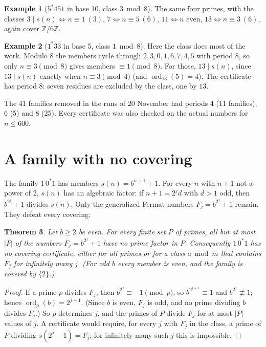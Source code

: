 \documentclass[11pt]{article}
\newtheorem{theorem}{Theorem}
\theoremstyle{definition}
\newtheorem{example}[theorem]{Example}
\theoremstyle{remark}
\newcommand{\ord}{\operatorname{ord}}
\begin{document}
\begin{example}[$5^*451$ in base 10, class $3 \bmod 8$]
The same four primes, with the classes $3\mid s(n)\iff n\equiv1\ (3)$, $7\iff n\equiv 5\ (6)$, $11\iff n$ even, $13\iff n\equiv 3\ (6)$, again cover $\mathbb{Z}/6\mathbb{Z}$.
\end{example}

\begin{example}[$1^*33$ in base 5, class $1 \bmod 8$]
Here the class does most of the work. Modulo $8$ the members cycle through $2,3,0,1,6,7,4,5$ with period $8$, so only $n\equiv 3\pmod 8$ gives members $\equiv 1\pmod 8$. For those, $13\mid s(n)$, since $13\mid s(n)$ exactly when $n\equiv 3\pmod 4$ (and $\ord_{13}(5)=4$). The certificate has period $8$: seven residues are excluded by the class, one by $13$.
\end{example}

The 41 families removed in the runs of 20 November had periods 4 (11 families), 6 (5) and 8 (25). Every certificate was also checked on the actual numbers for $n\le 600$.

\section{A family with no covering}

The family $1\,0^*1$ has members $s(n)=b^{n+1}+1$. For every $n$ with $n+1$ not a power of $2$, $s(n)$ has an algebraic factor: if $n+1=2^jd$ with $d>1$ odd, then $b^{2^j}+1$ divides $s(n)$. Only the generalized Fermat numbers $F_j=b^{2^j}+1$ remain. They defeat every covering:

\begin{theorem}\label{thm:gfn}
Let $b\ge2$ be even. For every finite set $P$ of primes, all but at most $|P|$ of the numbers $F_j=b^{2^j}+1$ have no prime factor in $P$. Consequently $1\,0^*1$ has no covering certificate, either for all primes or for a class $a\bmod m$ that contains $F_j$ for infinitely many $j$. (For odd $b$ every member is even, and the family is covered by $\{2\}$.)
\end{theorem}

\begin{proof}
If a prime $p$ divides $F_j$, then $b^{2^j}\equiv-1\pmod p$, so $b^{2^{j+1}}\equiv1$ and $b^{2^j}\not\equiv1$; hence $\ord_p(b)=2^{j+1}$. (Since $b$ is even, $F_j$ is odd, and no prime dividing $b$ divides $F_j$.) So $p$ determines $j$, and the primes of $P$ divide $F_j$ for at most $|P|$ values of $j$. A certificate would require, for every $j$ with $F_j$ in the class, a prime of $P$ dividing $s(2^j-1)=F_j$; for infinitely many such $j$ this is impossible.
\end{proof}
\end{document}
